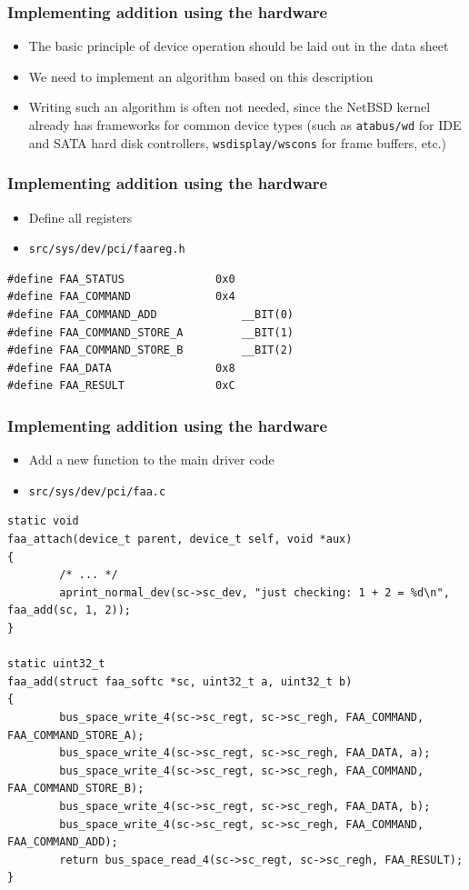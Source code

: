 \documentclass[dvipsnames,table]{beamer}
\begin{document}
\begin{frame}
\frametitle{Implementing addition using the hardware}
\begin{itemize}
	\item The basic principle of device operation should be laid out in the data sheet
	\item We need to implement an algorithm based on this description \hyperlink{faaop}{}
	\item Writing such an algorithm is often not needed, since the NetBSD kernel already has frameworks for common device types (such as {\tt atabus/wd} for IDE and SATA hard disk controllers, {\tt wsdisplay/wscons} for frame buffers, etc.)
\end{itemize}
\end{frame}

\begin{frame}[fragile]
\frametitle{Implementing addition using the hardware}
\begin{itemize}
	\item Define all registers
	\item {\tt src/sys/dev/pci/faareg.h}
\end{itemize}
\begin{lstlisting}
#define FAA_STATUS              0x0
#define FAA_COMMAND             0x4
#define FAA_COMMAND_ADD             __BIT(0)        
#define FAA_COMMAND_STORE_A         __BIT(1)
#define FAA_COMMAND_STORE_B         __BIT(2)
#define FAA_DATA                0x8
#define FAA_RESULT              0xC
\end{lstlisting}
\end{frame}

\begin{frame}[fragile]
\frametitle{Implementing addition using the hardware}
\begin{itemize}
	\item Add a new function to the main driver code
	\item {\tt src/sys/dev/pci/faa.c}
\end{itemize}
\begin{lstlisting}
static void
faa_attach(device_t parent, device_t self, void *aux)
{
        /* ... */
        aprint_normal_dev(sc->sc_dev, "just checking: 1 + 2 = %d\n", faa_add(sc, 1, 2));
}

static uint32_t
faa_add(struct faa_softc *sc, uint32_t a, uint32_t b)
{
        bus_space_write_4(sc->sc_regt, sc->sc_regh, FAA_COMMAND, FAA_COMMAND_STORE_A);
        bus_space_write_4(sc->sc_regt, sc->sc_regh, FAA_DATA, a);
        bus_space_write_4(sc->sc_regt, sc->sc_regh, FAA_COMMAND, FAA_COMMAND_STORE_B);
        bus_space_write_4(sc->sc_regt, sc->sc_regh, FAA_DATA, b);
        bus_space_write_4(sc->sc_regt, sc->sc_regh, FAA_COMMAND, FAA_COMMAND_ADD);
        return bus_space_read_4(sc->sc_regt, sc->sc_regh, FAA_RESULT);
}
\end{lstlisting}
\end{frame}
\end{document}
